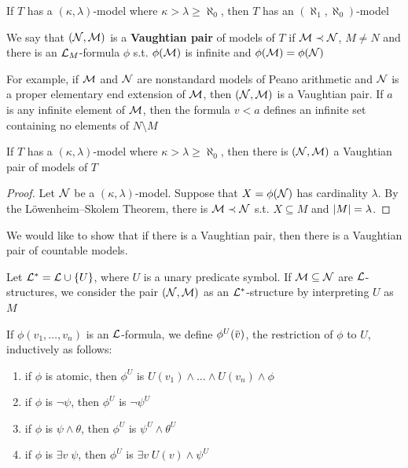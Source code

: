 \documentclass[11pt]{article}
\begin{document}
\begin{theorem}[]
\label{thm4.3.34}
If \(T\) has a \((\kappa,\lambda)\)-model where \(\kappa>\lambda\ge\aleph_0\), then \(T\) has an \((\aleph_1,\aleph_0)\)-model
\end{theorem}

\begin{definition}[]
We say that \((\mathcal{N},\mathcal{M})\) is a \textbf{Vaughtian pair} of models of \(T\) if \(\mathcal{M}\prec\mathcal{N}\), \(M\neq N\) and there is
an \(\mathcal{L}_M\)-formula \(\phi\) s.t. \(\phi(\mathcal{M})\) is infinite and  \(\phi(\mathcal{M})=\phi(\mathcal{N})\)
\end{definition}

For example, if \(\mathcal{M}\) and \(\mathcal{N}\) are nonstandard models of Peano arithmetic and \(\mathcal{N}\) is a proper
elementary end extension of \(\mathcal{M}\), then \((\mathcal{N},\mathcal{M})\) is a Vaughtian pair. If \(a\) is any infinite
element of \(\mathcal{M}\), then the formula \(v<a\) defines an infinite set containing no elements
of \(N\setminus M\)

\begin{lemma}[]
If \(T\) has a \((\kappa,\lambda)\)-model where \(\kappa>\lambda\ge\aleph_0\), then there is \((\mathcal{N},\mathcal{M})\) a Vaughtian pair of
models of \(T\)
\end{lemma}

\begin{proof}
Let \(\mathcal{N}\) be a \((\kappa,\lambda)\)-model. Suppose that \(X=\phi(\mathcal{N})\) has cardinality \(\lambda\). By the
Löwenheim–Skolem Theorem, there is \(\mathcal{M}\prec\mathcal{N}\) s.t. \(X\subseteq M\) and \(\abs{M}=\lambda\).
\end{proof}

We would like to show that if there is a Vaughtian pair, then there is a Vaughtian pair of
countable models.

Let \(\mathcal{L}^*=\mathcal{L}\cup\{U\}\), where \(U\) is a unary predicate symbol. If \(\mathcal{M}\subseteq\mathcal{N}\) are \(\mathcal{L}\)-structures, we
consider the pair \((\mathcal{N},\mathcal{M})\) as an \(\mathcal{L}^*\)-structure by interpreting \(U\) as \(M\)

If \(\phi(v_1,\dots,v_n)\) is an \(\mathcal{L}\)-formula, we define \(\phi^U(\barv)\), the restriction of \(\phi\) to \(U\),
inductively as follows:
\begin{enumerate}
\item if \(\phi\) is atomic, then \(\phi^U\) is \(U(v_1)\wedge\dots\wedge U(v_n)\wedge\phi\)
\item if \(\phi\) is \(\neg\psi\), then \(\phi^U\) is \(\neg\psi^U\)
\item if \(\phi\) is \(\psi\wedge\theta\), then \(\phi^U\) is \(\psi^U\wedge\theta^U\)
\item if \(\phi\) is \(\exists v\;\psi\), then \(\phi^U\) is \(\exists v\;U(v)\wedge\psi^U\)
\end{enumerate}
\end{document}
